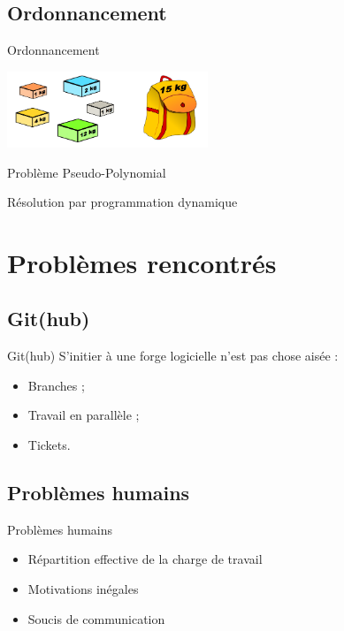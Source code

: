 \documentclass[xcolor=dvipsnames]{beamer}
\begin{document}
	\subsection{Ordonnancement}
		\begin{frame}{Ordonnancement}
\begin{center}
                \includegraphics[width=6cm]{images/knapsack.png}
\end{center}
                \begin{description}\itemsep15pt
                    \item Problème Pseudo-Polynomial
                    \item Résolution par programmation dynamique
                \end{description}

		\end{frame}

\section{Problèmes rencontrés}
\subsection{Git(hub)}
	\begin{frame}{Git(hub)}
	    S'initier à une forge logicielle n'est pas chose aisée :
		\begin{itemize}
		\setlength{\itemsep}{0.5cm}
			\item Branches ;
			\item Travail en parallèle ;
			\item Tickets.
		\end{itemize}
	\end{frame}
\subsection{Problèmes humains}
	\begin{frame}{Problèmes humains}
	    \begin{itemize}
		\setlength{\itemsep}{1cm}
	        \item Répartition effective de la charge de travail
	        \item Motivations inégales
	        \item Soucis de communication
        \end{itemize}
	\end{frame}
\end{document}
